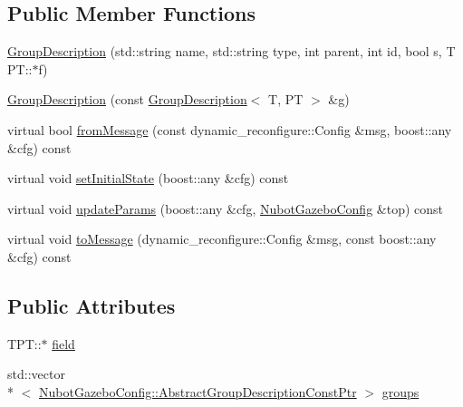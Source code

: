 \subsection*{Public Member Functions}
\begin{DoxyCompactItemize}
\item 
\hyperlink{classnubot__gazebo_1_1NubotGazeboConfig_1_1GroupDescription_aff7435eaf046c6ca409866b060aa23e7}{Group\-Description} (std\-::string name, std\-::string type, int parent, int id, bool s, T P\-T\-::$\ast$f)
\item 
\hyperlink{classnubot__gazebo_1_1NubotGazeboConfig_1_1GroupDescription_aa002967a2f81eed4f22086db313eb43b}{Group\-Description} (const \hyperlink{classnubot__gazebo_1_1NubotGazeboConfig_1_1GroupDescription}{Group\-Description}$<$ T, P\-T $>$ \&\hyperlink{nubot__gazebo_8cc_a6e550921d5c2c78c55be1c0d76512d45}{g})
\item 
virtual bool \hyperlink{classnubot__gazebo_1_1NubotGazeboConfig_1_1GroupDescription_a8568c8ede8e83ff03d92445c388bfe80}{from\-Message} (const dynamic\-\_\-reconfigure\-::\-Config \&msg, boost\-::any \&cfg) const 
\item 
virtual void \hyperlink{classnubot__gazebo_1_1NubotGazeboConfig_1_1GroupDescription_a001651fbda9582f61091bf6dfbbf1728}{set\-Initial\-State} (boost\-::any \&cfg) const 
\item 
virtual void \hyperlink{classnubot__gazebo_1_1NubotGazeboConfig_1_1GroupDescription_aab8da0558013dc2aea75880e3aaf1483}{update\-Params} (boost\-::any \&cfg, \hyperlink{classnubot__gazebo_1_1NubotGazeboConfig}{Nubot\-Gazebo\-Config} \&top) const 
\item 
virtual void \hyperlink{classnubot__gazebo_1_1NubotGazeboConfig_1_1GroupDescription_aaed67e4cda3ea6332bbf6bf71a5ed31d}{to\-Message} (dynamic\-\_\-reconfigure\-::\-Config \&msg, const boost\-::any \&cfg) const 
\end{DoxyCompactItemize}
\subsection*{Public Attributes}
\begin{DoxyCompactItemize}
\item 
T\-P\-T\-::$\ast$ \hyperlink{classnubot__gazebo_1_1NubotGazeboConfig_1_1GroupDescription_ad92a5d0dbf941d71437800f2ad833109}{field}
\item 
std\-::vector\\*
$<$ \hyperlink{classnubot__gazebo_1_1NubotGazeboConfig_aad0e4fda22f4c6a048f65a3de2f94c95}{Nubot\-Gazebo\-Config\-::\-Abstract\-Group\-Description\-Const\-Ptr} $>$ \hyperlink{classnubot__gazebo_1_1NubotGazeboConfig_1_1GroupDescription_a23ef3b68aea4d4672ff50ea6e8b16708}{groups}
\end{DoxyCompactItemize}


